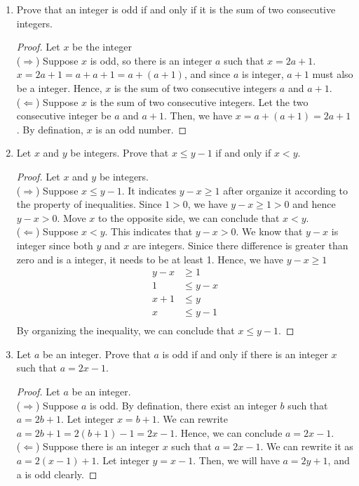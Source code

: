 \documentclass[12pt]{article}
\begin{document}
\begin{enumerate}
	\item 
	Prove that an integer is odd if and only if it is the sum of two consecutive integers.
	\begin{proof}
		Let $x$ be the integer\\
		($\Rightarrow$) Suppose $x$ is odd, so there is an integer $a$ such that $x = 2a+1$. $x=2a+1=a+a+1=a+(a+1)$, and since $a$ is integer, $a+1$ must also be a integer. Hence, $x$ is the sum of two consecutive integers $a$ and $a+1$.\\
		($\Leftarrow$) Suppose $x$ is the sum of two consecutive integers. Let the two consecutive integer be $a$ and $a+1$. Then, we have $x=a+(a+1)=2a+1$. By defination, $x$ is an odd number.
	\end{proof}
	\item 
	Let $x$ and $y$ be integers. Prove that $x \leq y-1$ if and only if $x<y$.
	\begin{proof}
		Let $x$ and $y$ be integers. \\
		($\Rightarrow$) Suppose $x \leq y-1$. It indicates $y-x \geq 1$ after organize it according to the property of inequalities. Since  $1>0$, we have 	$y-x \geq 1 > 0 $ and hence $y-x >0$. Move $x$ to the opposite side, we can conclude that $x<y$.\\
		($\Leftarrow$) Suppose $x<y$. This indicates that $y-x>0$. We know that $y-x$ is integer since both $y$ and $x$ are integers.	Sinice there difference is greater than zero and is a integer, it needs to be at least 1. Hence, we have $y-x\geq 1$
		\begin{align*}
			y-x &\geq 1\\
			1 &\leq y-x \\
			x+1 &\leq y\\
			x &\leq y-1\\
		\end{align*}
		By organizing the inequality, we can conclude that $x \leq y-1$.
	\end{proof}

\item Let $a$ be an integer. Prove that $a$ is odd if and only if there is an integer $x$ such that $a = 2x - 1$.	\begin{proof}
		Let $a$ be an integer. \\
		($\Rightarrow$) Suppose $a$ is odd. By defination, there exist an integer $b$ such that $a=2b+1$.
		Let integer $x=b+1$. We can rewrite $a=2b+1 = 2(b+1) -1 = 2x-1$.
		Hence, we can conclude $a=2x-1$.  \\
	   ($\Leftarrow$) Suppose there is an integer $x$ such that $a=2x-1$. We can rewrite it as $a=2(x-1)+1$.
	   Let integer $y=x-1$. Then, we will have $a=2y+1$, and a is odd clearly.
\end{proof}


\end{enumerate}
\end{document}
